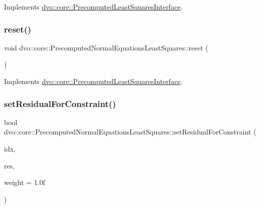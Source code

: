 Implements \mbox{\hyperlink{classdvo_1_1core_1_1_precomputed_least_squares_interface_a0ba3c8b938301387103912a9609a68dc}{dvo\+::core\+::\+Precomputed\+Least\+Squares\+Interface}}.

\mbox{\label{classdvo_1_1core_1_1_precomputed_normal_equations_least_squares_a591e3030f4736c580e37338ba747bc83}} 
\subsubsection{\texorpdfstring{reset()}{reset()}}
{\footnotesize\ttfamily void dvo\+::core\+::\+Precomputed\+Normal\+Equations\+Least\+Squares\+::reset (\begin{DoxyParamCaption}{ }\end{DoxyParamCaption})\hspace{0.3cm}{\ttfamily [virtual]}}



Implements \mbox{\hyperlink{classdvo_1_1core_1_1_precomputed_least_squares_interface_ae4b138a17c7959e780a0e30e935596e8}{dvo\+::core\+::\+Precomputed\+Least\+Squares\+Interface}}.

\mbox{\label{classdvo_1_1core_1_1_precomputed_normal_equations_least_squares_a5eb65ee043d392def0ab917ec18cf6ef}} 
\subsubsection{\texorpdfstring{set\+Residual\+For\+Constraint()}{setResidualForConstraint()}}
{\footnotesize\ttfamily bool dvo\+::core\+::\+Precomputed\+Normal\+Equations\+Least\+Squares\+::set\+Residual\+For\+Constraint (\begin{DoxyParamCaption}\item[{const size\+\_\+t \&}]{idx,  }\item[{const \mbox{\hyperlink{namespacedvo_1_1core_ab9c199d221775a923e2549ad7e15c323}{Num\+Type}} \&}]{res,  }\item[{const \mbox{\hyperlink{namespacedvo_1_1core_ab9c199d221775a923e2549ad7e15c323}{Num\+Type}} \&}]{weight = {\ttfamily 1.0f} }\end{DoxyParamCaption})\hspace{0.3cm}{\ttfamily [virtual]}}




